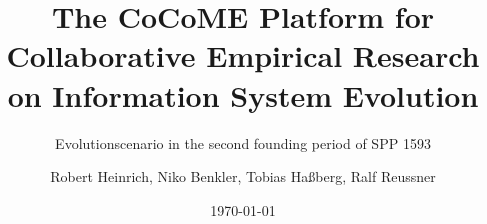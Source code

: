 \documentclass[12pt,headsepline,twoside,final]{scrreprt}
\begin{document}
	\setpdf
	
	\setcounter{secnumdepth}{3}
	
	\title{The CoCoME Platform for \linebreak Collaborative Empirical Research on Information System Evolution} 
	\subtitle{Evolutionscenario in the second founding period of SPP 1593}
	
	\author{Robert Heinrich, Niko Benkler, Tobias Ha{\ss}berg, Ralf Reussner}
	
	\date{\today}
	
	
	
	\maketitle
	\clearpage
	
	\tableofcontents
	\clearpage
	
	\listoffigures
	\clearpage
	
	
	
	
	
	
	
	
	
	
	
	
	
	
	
	
	
	\sloppy
\end{document}
